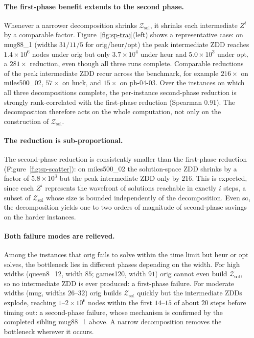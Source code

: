 \documentclass[conference]{IEEEtran}
\newcommand{\zsol}{\mathcal{Z}_{\mathrm{sol}}}
\newcommand{\OrigDecom}{\textsf{orig}\xspace}
\newcommand{\HeurDecom}{\textsf{heur}\xspace}
\newcommand{\OptDecom}{\textsf{opt}\xspace}
\begin{document}
\paragraph{The first-phase benefit extends to the second phase.}
Whenever a narrower decomposition shrinks $\zsol$, it shrinks each intermediate
$Z^i$ by a comparable factor. Figure~\ref{fig:sp-traj}(left) shows a
representative case: on \textsf{mug88\_1} (widths $31/11/5$ for
\OrigDecom/\HeurDecom/\OptDecom) the peak intermediate ZDD reaches
$1.4\times10^{6}$ nodes under \OrigDecom but only $3.7\times10^{4}$ under
\HeurDecom and $5.0\times10^{3}$ under \OptDecom, a $281\times$ reduction, even
though all three runs complete. Comparable reductions of the peak intermediate
ZDD recur across the benchmark, for example $216\times$ on \textsf{miles500\_02},
$57\times$ on \textsf{huck}, and $15\times$ on \textsf{ph-04-03}. Over the
instances on which all three decompositions complete, the per-instance
second-phase reduction is strongly rank-correlated with the first-phase
reduction (Spearman $0.91$). The decomposition therefore acts on the whole
computation, not only on the construction of $\zsol$.

\paragraph{The reduction is sub-proportional.}
The second-phase reduction is consistently smaller than the first-phase
reduction (Figure~\ref{fig:sp-scatter}): on \textsf{miles500\_02} the
solution-space ZDD shrinks by a factor of $5.8\times10^{3}$ but the peak
intermediate ZDD only by $216$. This is expected, since each $Z^i$ represents
the wavefront of solutions reachable in exactly $i$ steps, a subset of $\zsol$
whose size is bounded independently of the decomposition. Even so, the
decomposition yields one to two orders of magnitude of second-phase savings on
the harder instances.

\paragraph{Both failure modes are relieved.}
Among the instances that \OrigDecom fails to solve within the time limit but
\HeurDecom or \OptDecom solves, the bottleneck lies in different phases
depending on the width. For high widths (\textsf{queen8\_12}, width $85$;
\textsf{games120}, width $91$) \OrigDecom cannot even build $\zsol$, so no
intermediate ZDD is ever produced: a first-phase failure. For moderate widths
(\textsf{mug}, widths $26$--$32$) \OrigDecom builds $\zsol$ quickly but the
intermediate ZDDs explode, reaching $1$--$2\times10^{6}$ nodes within the first
$14$--$15$ of about $20$ steps before timing out: a second-phase failure, whose
mechanism is confirmed by the completed sibling \textsf{mug88\_1} above. A narrow
decomposition removes the bottleneck wherever it occurs.
\end{document}
